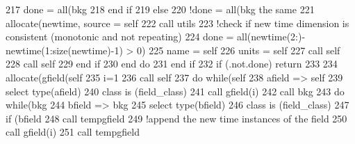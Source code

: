 \begin{DoxyCode}
217                     done = all(bkg%
218 \textcolor{keywordflow}{                end if}
219             \textcolor{keywordflow}{else}
220                 \textcolor{comment}{!done = all(bkg%
       the same}
221                 \textcolor{keyword}{allocate}(newtime, source = self%
222                 \textcolor{keyword}{call }utils%
223                 \textcolor{comment}{!check if new time dimension is consistent (monotonic and not repeating)}
224                 done = all(newtime(2:)-newtime(1:\textcolor{keyword}{size}(newtime)-1) > 0)
225                 name = self%
226                 units = self%
227                 \textcolor{keyword}{call }self%
228                 \textcolor{keyword}{call }self%
229 \textcolor{keywordflow}{            end if}
230 \textcolor{keywordflow}{        end do}
231 \textcolor{keywordflow}{    end if}
232     \textcolor{keywordflow}{if} (.not.done) \textcolor{keywordflow}{return}
233 
234     \textcolor{keyword}{allocate}(gfield(self%
235     i=1
236     \textcolor{keyword}{call }self%
237     \textcolor{keywordflow}{do} \textcolor{keywordflow}{while}(self%
238         afield => self%
239         \textcolor{keywordflow}{select type}(afield)
240 \textcolor{keywordflow}{        class is} (field\_class)
241             \textcolor{keyword}{call }gfield(i)%
242             \textcolor{keyword}{call }bkg%
243             \textcolor{keywordflow}{do} \textcolor{keywordflow}{while}(bkg%
244                 bfield => bkg%
245                 \textcolor{keywordflow}{select type}(bfield)
246 \textcolor{keywordflow}{                class is} (field\_class)
247                     \textcolor{keywordflow}{if} (bfield%
248                         \textcolor{keyword}{call }tempgfield%
249                         \textcolor{comment}{!append the new time instances of the field}
250                         \textcolor{keyword}{call }gfield(i)%
251                         \textcolor{keyword}{call }tempgfield%

\end{DoxyCode}
